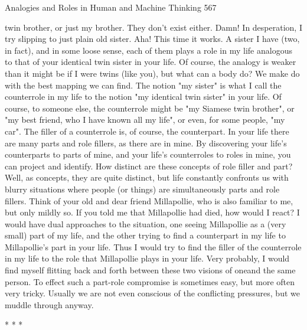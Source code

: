 Analogies and Roles in Human and Machine Thinking                                    567

twin brother, or just my brother. They don't exist either. Damn! In desperation, I try
slipping to just plain old sister. Aha! This time it works. A sister I have (two, in fact),
and in some loose sense, each of them plays a role in my life analogous to that of your
identical twin sister in your life.
         Of course, the analogy is weaker than it might be if I were twins (like you), but
what can a body do? We make do with the best mapping we can find. The notion "my
sister" is what I call the counterrole in my life to the notion "my identical twin sister"
in your life. Of course, to someone else, the counterrole might be "my Siamese twin
brother", or "my best friend, who I have known all my life", or even, for some people,
"my car". The filler of a counterrole is, of course, the counterpart. In your life there
are many parts and role fillers, as there are in mine. By discovering your life's
counterparts to parts of mine, and your life's counterroles to roles in mine, you can
project and identify.
         How distinct are these concepts of role filler and part? Well, as concepts, they
are quite distinct, but life constantly confronts us with blurry situations where people
(or things) are simultaneously parts and role fillers. Think of your old and dear friend
Millapollie, who is also familiar to me, but only mildly so. If you told me that
Millapollie had died, how would I react? I would have dual approaches to the
situation, one seeing Millapollie as a (very small) part of my life, and the other trying
to find a counterpart in my life to Millapollie's part in your life. Thus I would try to
find the filler of the counterrole in my life to the role that Millapollie plays in your
life. Very probably, I would find myself flitting back and forth between these two
visions of oneand the same person. To effect such a part-role compromise is
sometimes easy, but more often very tricky. Usually we are not even conscious of the
conflicting pressures, but we muddle through anyway.

                                        *   *   *

